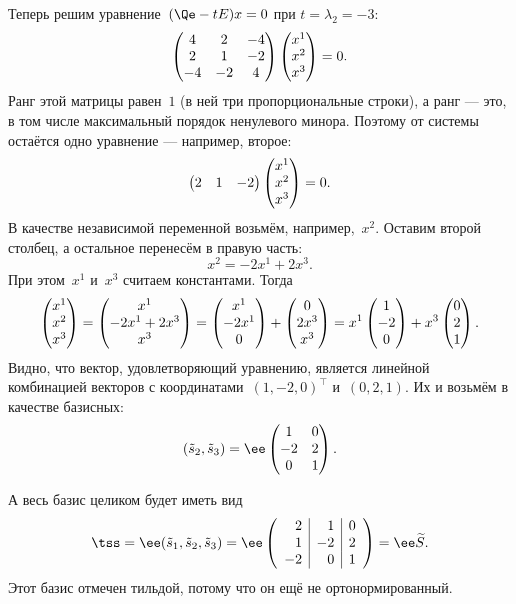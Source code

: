 \begin{solution}
	Теперь решим уравнение~$(\Qe - t E)x = 0$ при $t = \lambda_2 = -3$:
	\[
		\begin{pmatrix}
			4 & 2 & -4 \\
			2 & 1 & -2 \\
			-4 & -2 & 4
		\end{pmatrix}
		\begin{pmatrix}x^1 \\ x^2 \\ x^3\end{pmatrix}
		=
		0
		.
	\]
	Ранг этой матрицы равен~$1$ (в ней три пропорциональные строки), а ранг --- это, в том числе максимальный порядок ненулевого минора. Поэтому от системы остаётся одно уравнение --- например, второе:
	\[
		\begin{pmatrix}
			2 & 1 & -2 \\
		\end{pmatrix}
		\begin{pmatrix}x^1 \\ x^2 \\ x^3\end{pmatrix}
		=
		0
		.
	\]
	В качестве независимой переменной возьмём, например,~$x^2$. Оставим второй столбец, а остальное перенесём в правую часть:
	\[
		x^2 = -2x^1 + 2x^3
		.
	\]
	При этом~$x^1$ и~$x^3$ считаем константами.
	Тогда
	\[
		\begin{pmatrix}x^1 \\ x^2 \\ x^3\end{pmatrix} =
		\begin{pmatrix}x^1 \\ -2x^1 + 2x^3 \\ x^3\end{pmatrix} =
		\begin{pmatrix}x^1 \\ -2x^1 \\ 0\end{pmatrix}
		+
		\begin{pmatrix}0 \\ 2x^3 \\ x^3\end{pmatrix}
		=
		x^1
		\begin{pmatrix}1 \\ -2 \\ 0\end{pmatrix}
		+
		x^3
		\begin{pmatrix}0 \\ 2 \\ 1\end{pmatrix}
		.
	\]
	Видно, что вектор, удовлетворяющий уравнению, является линейной комбинацией векторов с координатами~$(1, -2, 0)^\top$ и~$(0, 2, 1)$. Их и возьмём в качестве базисных:
	\[
		(\ts_2, \ts_3) =
		\ee
		\begin{pmatrix}
			 1 & 0 \\
			-2 & 2 \\
			 0 & 1
		\end{pmatrix}
		.
	\]

	А весь базис целиком будет иметь вид
	\[
		\tss =
		\ee
		(\ts_1, \ts_2, \ts_3)
		=
		\ee
		\left( 
			\begin{array}{r|r|r}
				 2 &  1 & 0 \\
				 1 & -2 & 2 \\
				-2 &  0 & 1
			\end{array}
		\right)
		=
		\ee \tS
		.
	\]
	Этот базис отмечен тильдой, потому что он ещё не ортонормированный.


\end{solution}
